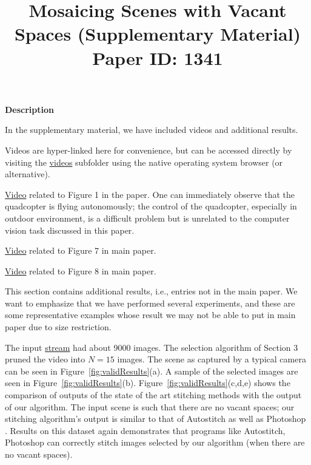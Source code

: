 \documentclass[10pt,twocolumn,letterpaper]{article}
\begin{document}
\title{Mosaicing Scenes with Vacant Spaces (Supplementary Material)  \\ Paper
ID: 1341 }

\maketitle
\setcounter{figure}{8}
\textbf{Description}

In the supplementary material, we have included videos and
additional results.

Videos are hyper-linked here for convenience, but can be accessed directly by
visiting the \href{videos}{videos} subfolder using the native operating system
browser (or alternative).

\vspace{7 mm}
\href{videos/teaser.avi}{Video} related to Figure 1 in the paper.
One can immediately observe that the quadcopter is flying autonomously; the control of the quadcopter,
especially in outdoor environment, is a difficult problem but is unrelated to the computer vision task
discussed in this paper.

\href{videos/lady1.avi} {Video} related to Figure 7 in main paper.


\href{videos/greenRed.avi} {Video} related to Figure 8 in main paper.

\vspace{7 mm}

This section contains additional results, i.e., entries not in the main paper.  We want to emphasize that we have performed several experiments,
and these are some representative examples whose result we may not be able to put in main paper due to size restriction.

\vspace{3 mm}
The input \href{videos/lady2.avi}{stream} had about 9000 images. The
selection algorithm of Section 3 pruned the video into $N=15$ images. The scene as captured by a typical camera 
can  be seen in 
Figure~\ref{fig:validResults}(a). A sample of the
selected images are seen in Figure~\ref{fig:validResults}(b).
Figure~\ref{fig:validResults}(c,d,e) shows the comparison of outputs of the state
of the art stitching methods with the output of our algorithm. The input scene
is such that there are no vacant
spaces; our stitching algorithm's output is similar to that of Autostitch
\cite{autostitch} as well as Photoshop \cite{photoshop}. Results on this dataset again demonstrates that programs like Autostitch, Photoshop can correctly stitch images selected by our algorithm (when there are no vacant spaces). 
\end{document}
